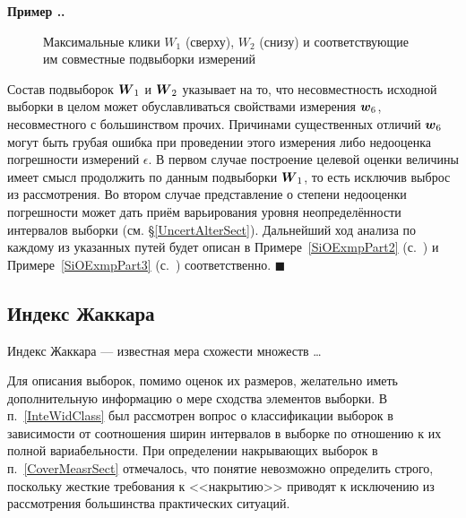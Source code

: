 \documentclass[a5paper,openany]{book}
\newcommand{\mbf}[1]{\protect\text{\boldmath$#1$}}
\newcounter{ExmpNum}[section]
\renewcommand{\theExmpNum}{\thesection.\arabic{ExmpNum}}
\newenvironment{example}%
  {\refstepcounter{ExmpNum}%
  \par\addvspace{\medskipamount} 
  \noindent\textbf{Пример {\theExmpNum}.}
  }%
  {\hfill$\blacksquare$\par\medskip}
\begin{document}
\begin{example}
\begin{figure}[ht]
\caption{Максимальные клики $W_1$ (сверху),  $W_2$ (снизу) и соответствующие им 
совместные подвыборки измерений}
\label{SiOCliquesPic}
\end{figure}


Состав подвыборок $\mbf{W}_1$  и $\mbf{W}_2$ указывает на то, что несовместность 
исходной выборки в целом может обуславливаться свойствами измерения $\mbf{w}_6$, 
несовместного с большинством прочих. Причинами существенных отличий $\mbf{w}_6$ могут 
быть грубая ошибка при проведении этого измерения либо недооценка погрешности измерений 
$\epsilon$. В первом случае построение целевой оценки величины имеет смысл продолжить 
по данным подвыборки $\mbf{W}_1$, то есть исключив выброс из рассмотрения. Во втором 
случае представление о степени недооценки погрешности может дать приём варьирования 
уровня неопределённости интервалов выборки (см. \S\ref{UncertAlterSect}). Дальнейший 
ход анализа по каждому из указанных путей будет описан в Примере~\ref{SiOExmpPart2} 
(с.~\pageref{SiOExmpPart2}) и Примере~\ref{SiOExmpPart3} (с.~\pageref{SiOExmpPart3}) 
соответственно. 
\end{example} 
   
  
\subsection{Индекс Жаккара} 
  
Индекс Жаккара --- известная мера схожести множеств \ldots
{} 

Для описания выборок, помимо оценок их размеров, желательно иметь дополнительную информацию о мере сходства элементов выборки. В п.~\ref{InteWidClass} был рассмотрен вопрос о классификации выборок в зависимости от соотношения ширин интервалов в выборке по отношению к их полной вариабельности.
При определении накрывающих выборок в п.~\ref{CoverMeasrSect} отмечалось, что понятие невозможно определить строго, поскольку жесткие требования к <<накрытию>> приводят к исключению из рассмотрения большинства практических ситуаций.
\end{document}

